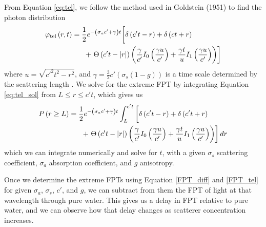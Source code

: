 \documentclass[9pt,twocolumn,twoside]{opticajnl}
\begin{document}
From Equation \ref{eq:tel}, we follow the method used in Goldstein (1951) to find the photon distribution
\begin{align}
    \varphi_{\textrm{tel}} \left(r,t\right) &= \frac{1}{2} e^{-\left(\sigma_{a}c' + \gamma \right)t} \bigg[\delta \left(c't - r\right) + \delta\left(ct + r\right) \notag\\
    &\ \ \ \ \ +\left. \Theta\left(c't - |r|\right) \left(\frac{\gamma}{c'}I_{0}\left(\frac{\gamma u}{c'}\right) + \frac{\gamma t}{u}I_{1}\left(\frac{\gamma u}{c'}\right)\right)\right] \label{eq:tel_sol}
\end{align}
where $u=\sqrt{c'^{2}t^{2}-r^{2}}$, and $\gamma = \frac{3}{2} c'\left(\sigma_{s}\left(1-g\right)\right)$ is a time scale determined by the scattering length \cite{goldstein_diffusion_1951,masoliver_solution_1993,masoliver_telegraphers_1994,masoliver_finite-velocity_1996}. We solve for the extreme FPT by integrating Equation \ref{eq:tel_sol} from $L \leq r \leq c' t$, which gives us
\begin{align}
    P\left(r\geq L\right) &=  \frac{1}{2}e^{-\left(\sigma_{a}c' + \gamma \right)t} \int^{c' t}_{L}\bigg[ \delta \left(c't - r\right)  + \delta\left(c't + r\right) \notag\\
    &\left.\ \ \ \ \ + \  \Theta\left(c't - |r|\right) \left(\frac{\gamma}{c'}I_{0}\left(\frac{\gamma u}{c'}\right) + \frac{\gamma t}{u}I_{1}\left(\frac{\gamma u}{c'}\right)\right)\right]  dr \label{FPT_tel}
\end{align}
which we can integrate numerically and solve for $t$, with a given $\sigma_{s}$ scattering coefficient, $\sigma_{a}$ absorption coefficient, and $g$ anisotropy. 

Once we determine the extreme FPTs using Equation \ref{FPT_diff} and \ref{FPT_tel} for given $\sigma_{a}$, $\sigma_{s}$, $c'$, and $g$, we can subtract from them the FPT of light at that wavelength through pure water. This gives us a delay in FPT relative to pure water, and we can observe how that delay changes as scatterer concentration increases.
\end{document}
